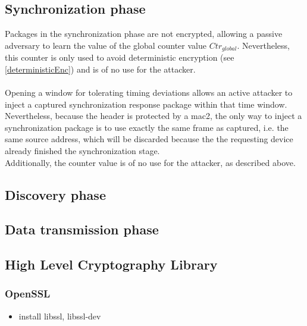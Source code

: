 \subsection{Synchronization phase}
Packages in the synchronization phase are not encrypted, allowing a passive adversary to learn the value of the global counter value $Ctr_{global}$. Nevertheless,
this counter is only used to avoid deterministic encryption (see \ref{deterministicEnc}) and is of no use for the attacker.
\\
\\
Opening a window for tolerating timing deviations allows an active attacker to inject a captured synchronization response package within that time window.
Nevertheless, because the header is protected by a \gls{mac2}, the only way to inject a synchronization package is to use exactly the same frame as captured,
i.e. the same source address, which will be discarded because the the requesting device already finished the synchronization stage.
\\
Additionally, the counter value is of no use for the attacker, as described above.

\subsection{Discovery phase}

\subsection{Data transmission phase}


\subsection{High Level Cryptography Library}

\subsubsection{OpenSSL}

\begin{itemize}
 \item install libssl, libssl-dev
\end{itemize}

